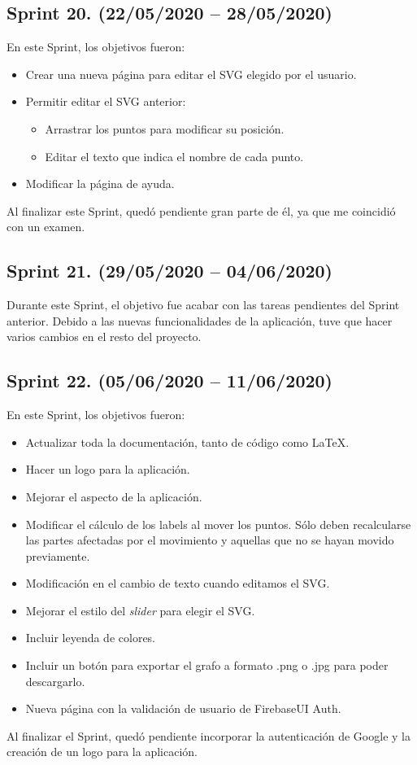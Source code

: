 \subsection{Sprint 20. (22/05/2020 -- 28/05/2020)}
En este Sprint, los objetivos fueron:
\begin{itemize}
	\item Crear una nueva página para editar el SVG elegido por el usuario.
	\item Permitir editar el SVG anterior:
	\begin{itemize}
		\item Arrastrar los puntos para modificar su posición.
		\item Editar el texto que indica el nombre de cada punto.
	\end{itemize}
	\item Modificar la página de ayuda.
\end{itemize}
Al finalizar este Sprint, quedó pendiente gran parte de él, ya que me coincidió con un examen.

\subsection{Sprint 21. (29/05/2020 -- 04/06/2020)}
Durante este Sprint, el objetivo fue acabar con las tareas pendientes del Sprint anterior. Debido a las nuevas funcionalidades de la aplicación, tuve que hacer varios cambios en el resto del proyecto.

\subsection{Sprint 22. (05/06/2020 -- 11/06/2020)}
En este Sprint, los objetivos fueron:
\begin{itemize}
	\item Actualizar toda la documentación, tanto de código como \LaTeX.
	\item Hacer un logo para la aplicación.
	\item Mejorar el aspecto de la aplicación.
	\item Modificar el cálculo de los labels al mover los puntos. Sólo deben recalcularse las partes afectadas por el movimiento y aquellas que no se hayan movido previamente.
	\item Modificación en el cambio de texto cuando editamos el SVG.
	\item Mejorar el estilo del \emph{slider} para elegir el SVG.
	\item Incluir leyenda de colores.
	\item Incluir un botón para exportar el grafo a formato .png o .jpg para poder descargarlo.
	\item Nueva página con la validación de usuario de FirebaseUI Auth.
\end{itemize}
Al finalizar el Sprint, quedó pendiente incorporar la autenticación de Google y la creación de un logo para la aplicación.


